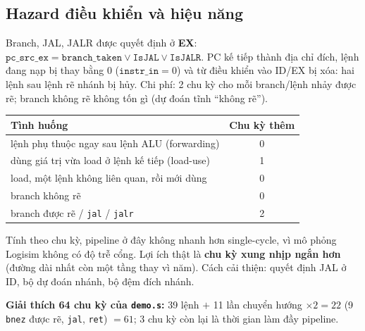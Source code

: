 \documentclass[11pt,a4paper]{article}
\begin{document}
\subsection{Hazard điều khiển và hiệu năng}
Branch, JAL, JALR được quyết định ở \textbf{EX}: $\mathtt{pc\_src\_ex}=\mathtt{branch\_taken}\lor\mathtt{IsJAL}\lor\mathtt{IsJALR}$. PC kế tiếp thành địa chỉ đích, lệnh đang nạp bị thay bằng 0 ($\mathtt{instr\_in}=0$) và từ điều khiển vào ID/EX bị xóa: hai lệnh sau lệnh rẽ nhánh bị hủy. Chi phí: 2 chu kỳ cho mỗi branch/lệnh nhảy được rẽ; branch không rẽ không tốn gì (dự đoán tĩnh ``không rẽ'').

\begin{center}
\begin{tabular}{@{}lc@{}}
\toprule
\textbf{Tình huống} & \textbf{Chu kỳ thêm}\\
\midrule
lệnh phụ thuộc ngay sau lệnh ALU (forwarding) & 0\\
dùng giá trị vừa load ở lệnh kế tiếp (load-use) & 1\\
load, một lệnh không liên quan, rồi mới dùng & 0\\
branch không rẽ & 0\\
branch được rẽ / \texttt{jal} / \texttt{jalr} & 2\\
\bottomrule
\end{tabular}
\end{center}

Tính theo chu kỳ, pipeline ở đây không nhanh hơn single-cycle, vì mô phỏng Logisim không có độ trễ cổng. Lợi ích thật là \textbf{chu kỳ xung nhịp ngắn hơn} (đường dài nhất còn một tầng thay vì năm). Cách cải thiện: quyết định JAL ở ID, bộ dự đoán nhánh, bộ đệm đích nhánh.

\textbf{Giải thích 64 chu kỳ của \texttt{demo.s}:} 39 lệnh $+$ 11 lần chuyển hướng $\times2=22$ (9 \texttt{bnez} được rẽ, \texttt{jal}, \texttt{ret}) $=61$; 3 chu kỳ còn lại là thời gian làm đầy pipeline.
\end{document}

